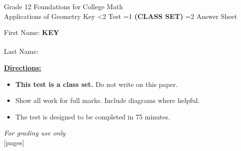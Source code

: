 \documentclass[addpoints]{exam}
\newcommand{\event}{Applications of Geometry}
\newcommand{\tournament}{}
\def\type{0}
\begin{document}
\begin{center}
    {\huge Grade 12 Foundations for College Math \\ \event
    \ifprintanswers \space Key
    \else \space \ifnum\type<2 Test \fi \ifnum\type=1 \textbf{(CLASS SET)} \fi
          \ifnum\type=2 Answer Sheet \fi
    \fi \\ \vspace{3mm}\tournament\vspace{1mm}}
\end{center}

\vspace{.25\textheight}

\begin{center}
    First Name: \ifprintanswers
    \underline{\hspace{3.5cm}}\textbf{KEY}\underline{\hspace{5.5cm}}\\\vspace{5mm}
    \else \underline{\hspace{10cm}}\\ \vspace{5mm} \fi
    Last Name: \underline{\hspace{10cm}}\\ \vspace{5mm}
\end{center}

\noindent\textbf{\underline{Directions:}}
\begin{itemize}
    \ifnum\type=1 \item \textbf{This test is a class set.} Do not write on this paper. \fi
    \item Show all work for full marks. Include diagrams where helpful.
    \item The test is designed to be completed in 75 minutes.
\end{itemize}
\begin{center}
\textit{For grading use only}\\
[pages]
\end{center}
\end{document}

